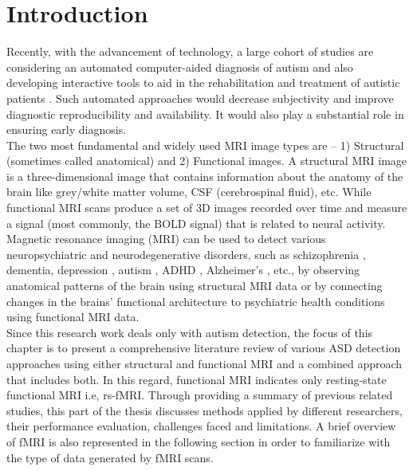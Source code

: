 \section{Introduction}
Recently, with the advancement of technology, a large cohort of studies are considering an automated computer-aided diagnosis of autism \cite{leo2019computational, han2017global, liu2017technology} and also developing interactive tools to aid in the rehabilitation and treatment of autistic patients \cite{johnston2020soundfields, johnston2019measuring, magrini2019augmented}. Such automated approaches would decrease subjectivity and improve diagnostic reproducibility and availability. It would also play a substantial role in ensuring early diagnosis. \\

The two most fundamental and widely used MRI image types are – 1) Structural (sometimes
called anatomical) and 2) Functional images. A structural MRI image is a three-dimensional
image that contains information about the anatomy of the brain like grey/white matter
volume, \Gls{CSF} (cerebrospinal fluid), etc. While functional MRI scans produce a set of 3D
images recorded over time and measure a signal (most commonly, the \gls{BOLD} signal) that is
related to neural activity. Magnetic resonance imaging (MRI) can be used to detect various neuropsychiatric and neurodegenerative disorders, such as schizophrenia \cite{garrity2007aberrant, zhou2007functional, jafri2008method, calhoun2012exploring}, dementia, depression \cite{craddock2009disease}, autism \cite{plitt2015functional, anderson2011functional, shi2020fmri, rakhimberdina2020population}, ADHD \cite{zhang2020separated}, Alzheimer’s \cite{greicius2004default, chen2011classification}, etc., by observing anatomical patterns of the brain using structural MRI data or by connecting changes in the brains’ functional architecture to psychiatric health conditions using functional MRI data.\\

Since this research work deals only with autism detection, the focus of this chapter is to
present a comprehensive literature review of various ASD detection approaches using either
structural and functional MRI and a combined approach that includes both. In this regard,
functional MRI indicates only resting-state functional MRI i.e, rs-fMRI. Through providing a
summary of previous related studies, this part of the thesis discusses methods applied by
different researchers, their performance evaluation, challenges faced and limitations. A brief overview of fMRI is also represented in the following section in order to familiarize with the type of data generated by fMRI scans.\\

